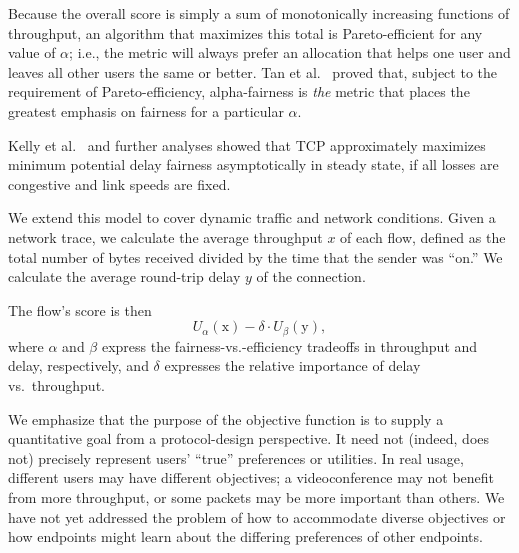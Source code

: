 Because the overall score is simply a sum of monotonically increasing
functions of throughput, an algorithm that maximizes this total is
Pareto-efficient for any value of $\alpha$; i.e., the metric will
always prefer an allocation that helps one user and leaves all other
users the same or better. Tan et al.~\cite{Tan09} proved that, subject
to the requirement of Pareto-efficiency, alpha-fairness is \emph{the}
metric that places the greatest emphasis on fairness for a particular
$\alpha$.

Kelly et al.~\cite{Kelly98} and further analyses showed that TCP
approximately maximizes minimum potential delay fairness
asymptotically in steady state, if all losses are congestive and link
speeds are fixed.

We extend this model to cover dynamic traffic and network
conditions. Given a network trace, we calculate the average throughput
$x$ of each flow, defined as the total number of bytes received
divided by the time that the sender was ``on.'' We calculate the
average round-trip delay $y$ of the connection.

The flow's score is then 
\begin{equation}
U_\alpha(\textrm{x}) - \delta \cdot U_\beta(\textrm{y}),
\label{eq:util}
\end{equation}
where $\alpha$ and $\beta$ express the fairness-vs.-efficiency
tradeoffs in throughput and delay, respectively, and $\delta$
expresses the relative importance of delay vs.~throughput.%


We emphasize that the purpose of the objective function is to supply a
quantitative goal from a protocol-design perspective. It need not
(indeed, does not) precisely represent users' ``true'' preferences or
utilities. In real usage, different users may have different
objectives; a videoconference may not benefit from more throughput, or
some packets may be more important than others. We have not yet
addressed the problem of how to accommodate diverse objectives or how
endpoints might learn about the differing preferences of other
endpoints.


